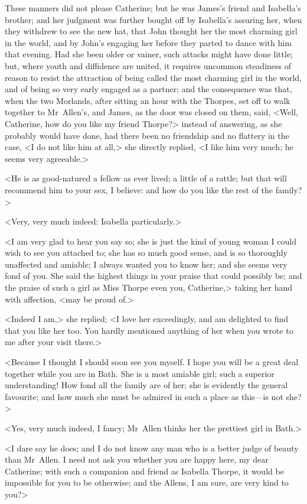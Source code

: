  These manners did not please Catherine; but he was James's friend and Isabella's brother; and her judgment was further bought off by Isabella's assuring her, when they withdrew to see the new hat, that John thought her the most charming girl in the world, and by John's engaging her before they parted to dance with him that evening. Had she been older or vainer, such attacks might have done little; but, where youth and diffidence are united, it requires uncommon steadiness of reason to resist the attraction of being called the most charming girl in the world, and of being so very early engaged as a partner; and the consequence was that, when the two Morlands, after sitting an hour with the Thorpes, set off to walk together to Mr~Allen's, and James, as the door was closed on them, said, <Well, Catherine, how do you like my friend Thorpe?> instead of answering, as she probably would have done, had there been no friendship and no flattery in the case, <I do not like him at all,> she directly replied, <I like him very much; he seems very agreeable.> 

 <He is as good-natured a fellow as ever lived; a little of a rattle; but that will recommend him to your sex, I believe: and how do you like the rest of the family?> 

 <Very, very much indeed: Isabella particularly.> 

 <I am very glad to hear you say so; she is just the kind of young woman I could wish to see you attached to; she has so much good sense, and is so thoroughly unaffected and amiable; I always wanted you to know her; and she seems very fond of you. She said the highest things in your praise that could possibly be; and the praise of such a girl as Miss Thorpe even you, Catherine,> taking her hand with affection, <may be proud of.> 

 <Indeed I am,> she replied; <I love her exceedingly, and am delighted to find that you like her too. You hardly mentioned anything of her when you wrote to me after your visit there.> 

 <Because I thought I should soon see you myself. I hope you will be a great deal together while you are in Bath. She is a most amiable girl; such a superior understanding! How fond all the family are of her; she is evidently the general favourite; and how much she must be admired in such a place as this—is not she?> 

 <Yes, very much indeed, I fancy; Mr~Allen thinks her the prettiest girl in Bath.> 

 <I dare say he does; and I do not know any man who is a better judge of beauty than Mr~Allen. I need not ask you whether you are happy here, my dear Catherine; with such a companion and friend as Isabella Thorpe, it would be impossible for you to be otherwise; and the Allens, I am sure, are very kind to you?> 


